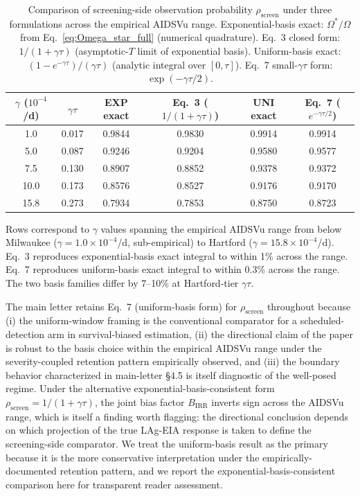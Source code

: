 \documentclass[11pt]{article}
\begin{document}
\begin{table}[H]
\centering
\small
\caption{Comparison of screening-side observation probability $\rho_{\mathrm{screen}}$ under three formulations across the empirical AIDSVu range. Exponential-basis exact: $\Omega^*/\Omega$ from Eq.~\ref{eq:Omega_star_full} (numerical quadrature). Eq.~3 closed form: $1/(1+\gamma\tau)$ (asymptotic-$T$ limit of exponential basis). Uniform-basis exact: $(1-e^{-\gamma\tau})/(\gamma\tau)$ (analytic integral over $[0,\tau]$). Eq.~7 small-$\gamma\tau$ form: $\exp(-\gamma\tau/2)$.}
\label{tab:basis_comparison}
\begin{tabular}{cccccc}
\toprule
$\gamma$ ($10^{-4}$/d) & $\gamma\tau$ & EXP exact & Eq.~3 ($1/(1+\gamma\tau)$) & UNI exact & Eq.~7 ($e^{-\gamma\tau/2}$) \\
\midrule
1.0  & 0.017 & 0.9844 & 0.9830 & 0.9914 & 0.9914 \\
5.0  & 0.087 & 0.9246 & 0.9204 & 0.9580 & 0.9577 \\
7.5  & 0.130 & 0.8907 & 0.8852 & 0.9378 & 0.9372 \\
10.0 & 0.173 & 0.8576 & 0.8527 & 0.9176 & 0.9170 \\
15.8 & 0.273 & 0.7934 & 0.7853 & 0.8750 & 0.8723 \\
\bottomrule
\end{tabular}
\vspace{0.3em}
\footnotesize
\begin{flushleft}
Rows correspond to $\gamma$ values spanning the empirical AIDSVu range from below Milwaukee ($\gamma = 1.0\times10^{-4}$/d, sub-empirical) to Hartford ($\gamma = 15.8\times10^{-4}$/d). Eq.~3 reproduces exponential-basis exact integral to within 1\% across the range. Eq.~7 reproduces uniform-basis exact integral to within 0.3\% across the range. The two basis families differ by 7--10\% at Hartford-tier $\gamma\tau$.
\end{flushleft}
\end{table}

The main letter retains Eq.~7 (uniform-basis form) for $\rho_{\mathrm{screen}}$ throughout because (i) the uniform-window framing is the conventional comparator for a scheduled-detection arm in survival-biased estimation, (ii) the directional claim of the paper is robust to the basis choice within the empirical AIDSVu range under the severity-coupled retention pattern empirically observed, and (iii) the boundary behavior characterized in main-letter §4.5 is itself diagnostic of the well-posed regime. Under the alternative exponential-basis-consistent form $\rho_{\mathrm{screen}} = 1/(1+\gamma\tau)$, the joint bias factor $B_{\mathrm{IRR}}$ inverts sign across the AIDSVu range, which is itself a finding worth flagging: the directional conclusion depends on which projection of the true LAg-EIA response is taken to define the screening-side comparator. We treat the uniform-basis result as the primary because it is the more conservative interpretation under the empirically-documented retention pattern, and we report the exponential-basis-consistent comparison here for transparent reader assessment.
\end{document}
